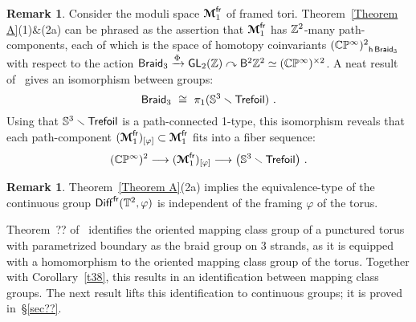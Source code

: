 \documentclass{amsart}
\theoremstyle{definition}
\newtheorem{remark}[theorem]{Remark}
\newtheorem{notation}[theorem]{Notation}
\theoremstyle{remark}
\newcommand{\lacts}{\curvearrowright}
\DeclareMathOperator{\Diff}{{\sf Diff}}
\DeclareMathOperator{\fr}{\sf fr}
\newcommand{\xra}{\xrightarrow}
\def\bcM{\boldsymbol{\mathcal M}}\def\bcN{\boldsymbol{\mathcal N}}\def\bcO{\boldsymbol{\mathcal O}}\def\bcP{\boldsymbol{\mathcal P}}\def\bcQ{\boldsymbol{\mathcal Q}}\def\bcR{\boldsymbol{\mathcal R}}
\def\bcM{\boldsymbol{\mathcal M}}
\DeclareMathOperator{\Braid}{{\sf Braid}_3}
\DeclareMathOperator{\GL}{\sf GL}
\begin{document}
\begin{remark}
Consider the moduli space $\bcM^{\fr}_1$ of framed tori.  
Theorem~\ref{Theorem A}(1)\&(2a) can be phrased as the assertion that $\bcM^{\fr}_1$ has $\mathbb Z^2$-many path-components, each of which is the space of homotopy coinvariants ${(\CC\PP^\infty)^2}_{{\sf h} \Braid}$ with respect to the action $\Braid \xra{\Phi} \GL_2(\ZZ) \lacts \sB^2 \ZZ^2 \simeq (\CC\PP^\infty)^{\times 2}$.
A neat result of~{\color{red}\cite{??}} gives an isomorphism between groups: 
\[
\Braid
~\cong~ 
\pi_1 (\SS^3 \smallsetminus {\sf Trefoil} )
~.
\]
Using that $\mathbb S^3 \smallsetminus {\sf Trefoil}$ is a path-connected 1-type, this isomorphism reveals that each path-component $(\bcM^{\fr}_1)_{[\varphi]} \subset \bcM^{\fr}_1$ fits into a fiber sequence:
\[
(\CC\PP^\infty)^2
\longrightarrow
(\bcM^{\fr}_1)_{[\varphi]}
\longrightarrow
\bigl( \SS^3 \smallsetminus {\sf Trefoil} \bigr)
~.
\]


\end{remark}





\begin{remark}
Theorem~\ref{Theorem A}(2a) implies the equivalence-type of the continuous group $\Diff^{\fr}(\TT^2,\varphi)$ is independent of the framing $\varphi$ of the torus.  

\end{remark}


%
%


Theorem~?? of~\cite{??} identifies the oriented mapping class group of a punctured torus with parametrized boundary as the braid group on 3 strands, as it is equipped with a homomorphism to the oriented mapping class group of the torus.  
Together with Corollary~\ref{t38}, this results in an identification between mapping class groups.  
The next result lifts this identification to continuous groups; it is proved in~\S\ref{sec??}.  
\end{document}
